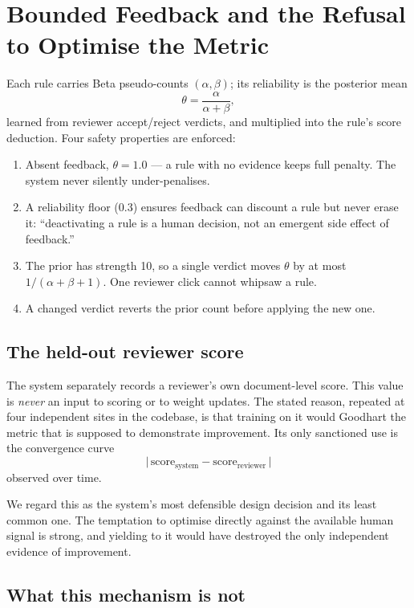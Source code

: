 \documentclass[10pt]{article}
\begin{document}
\section{Bounded Feedback and the Refusal to Optimise the Metric}
\label{sec:feedback}

Each rule carries Beta pseudo-counts $(\alpha, \beta)$; its reliability is the
posterior mean
\[
\theta = \frac{\alpha}{\alpha + \beta},
\]
learned from reviewer accept/reject verdicts, and multiplied into the rule's
score deduction. Four safety properties are enforced:

\begin{enumerate}
  \item Absent feedback, $\theta = 1.0$ --- a rule with no evidence keeps full
        penalty. The system never silently under-penalises.
  \item A reliability floor (0.3) ensures feedback can discount a rule but
        never erase it: ``deactivating a rule is a human decision, not an
        emergent side effect of feedback.''
  \item The prior has strength 10, so a single verdict moves $\theta$ by at
        most $1/(\alpha+\beta+1)$. One reviewer click cannot whipsaw a rule.
  \item A changed verdict reverts the prior count before applying the new one.
\end{enumerate}

\subsection{The held-out reviewer score}

The system separately records a reviewer's own document-level score. This value
is \emph{never} an input to scoring or to weight updates. The stated reason,
repeated at four independent sites in the codebase, is that training on it
would Goodhart the metric that is supposed to demonstrate improvement. Its only
sanctioned use is the convergence curve
\[
\big|\, \text{score}_{\text{system}} - \text{score}_{\text{reviewer}} \,\big|
\]
observed over time.

We regard this as the system's most defensible design decision and its least
common one. The temptation to optimise directly against the available human
signal is strong, and yielding to it would have destroyed the only independent
evidence of improvement.

\subsection{What this mechanism is not}
\end{document}
